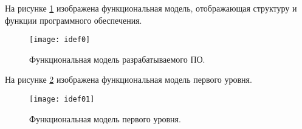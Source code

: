 На рисунке \ref{img:idef0} изображена функциональная модель, отображающая структуру и функции программного обеспечения. 

\begin{figure}[H]
	\centering
	\texttt{[image: idef0]}
	\caption{Функциональная модель разрабатываемого ПО. }
	\label{img:idef0}
\end{figure}

На рисунке \ref{img:idef01} изображена функциональная модель первого уровня. 

\begin{figure}[H]
	\centering
	\texttt{[image: idef01]}
	\caption{Функциональная модель первого уровня. }
	\label{img:idef01}
\end{figure}
